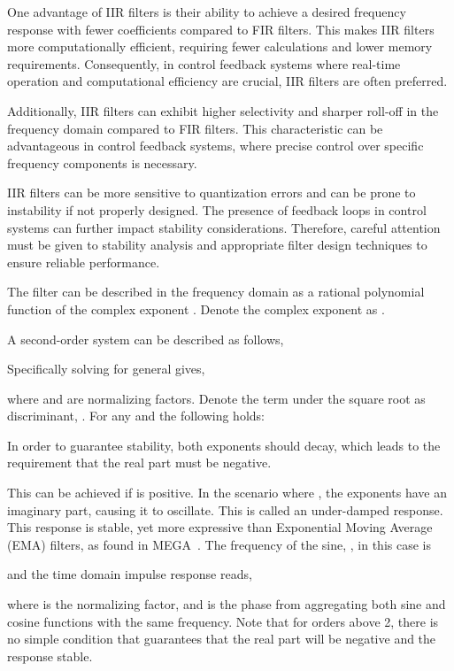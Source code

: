 \documentclass[11pt]{article}
\begin{document}
One advantage of IIR filters is their ability to achieve a desired frequency response with fewer coefficients compared to FIR filters. This makes IIR filters more computationally efficient, requiring fewer calculations and lower memory requirements. Consequently, in control feedback systems where real-time operation and computational efficiency are crucial, IIR filters are often preferred.

Additionally, IIR filters can exhibit higher selectivity and sharper roll-off in the frequency domain compared to FIR filters. This characteristic can be advantageous in control feedback systems, where precise control over specific frequency components is necessary.

{}
IIR filters can be more sensitive to quantization errors and can be prone to instability if not properly designed. The presence of feedback loops in control systems can further impact stability considerations. Therefore, careful attention must be given to stability analysis and appropriate filter design techniques to ensure reliable performance.

The filter can be described in the frequency domain as a rational polynomial function of the complex exponent . Denote the complex exponent as . 

A second-order system can be described as follows,

Specifically solving for general  gives,

where  and  are normalizing factors. Denote the term under the square root as discriminant, . For any  and  the following holds:

In order to guarantee stability, both exponents should decay, which leads to the requirement that the real part must be negative.

This can be achieved if  is positive. 
In the scenario where , the exponents have an imaginary part, causing it to oscillate.  This is called an under-damped response.
This response is stable, yet more expressive than Exponential Moving Average (EMA) filters, as found in MEGA~\cite{ma2022mega}.
The frequency of the sine, , in this case is
 
and the time domain impulse response reads,

where  is the normalizing factor, and  is the phase from aggregating both sine and cosine functions with the same frequency. 
Note that for orders above 2, there is no simple condition that guarantees that the real part will be negative and the response stable.
\end{document}
